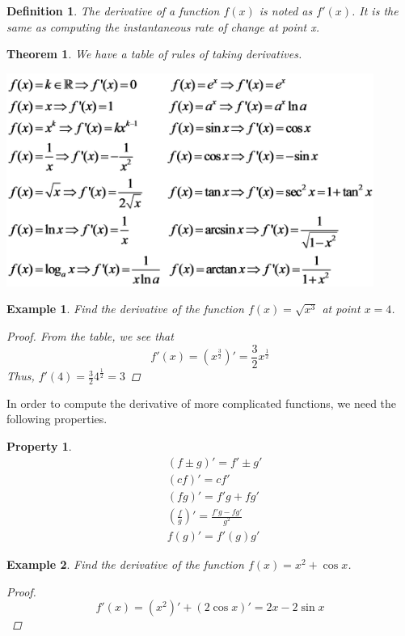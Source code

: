 \documentclass{article}
\newtheorem{definition}{Definition}
\newtheorem{property}{Property}
\newtheorem{ex}{Example}
\newtheorem{thm}{Theorem}
\begin{document}
\begin{definition}
	The derivative of a function $f(x)$ is noted as $f'(x)$. It is the same as computing the instantaneous rate of change at point x.
\end{definition}

\begin{thm}
We have a table of rules of taking derivatives.
	
\begin{center}
	\includegraphics*[width=12cm]{deriv11.png}
\end{center}
\end{thm}

\begin{ex}
	Find the derivative of the function $f(x) = \sqrt{x^3}$ at point $x=4$.
	
	\begin{proof}
		From the table, we see that 
		\[ f'(x) = (x^{\frac{3}{2}})' = \frac{3}{2} x^{\frac{1}{2}} \]
		Thus, $f'(4) = \frac{3}{2}4^{\frac{1}{2}} = 3$
	\end{proof}
\end{ex}

In order to compute the derivative of more complicated functions, we need the following properties.
\begin{property}
	\begin{align}
	&(f\pm g)' = f' \pm g'\\
	&(cf)' = cf'\\
	&(fg)' = f'g+fg'\\
	&(\frac{f}{g})' = \frac{f'g-fg'}{g^2}\\
	& f(g)' = f'(g)g'
	\end{align}
\end{property}


\begin{ex}
	Find the derivative of the function $f(x)= x^2 + \cos x$.
	\begin{proof}
		\[ f'(x) = (x^2)' + (2\cos x)' = 2x - 2\sin x \]
	\end{proof}
\end{ex}
\end{document}
